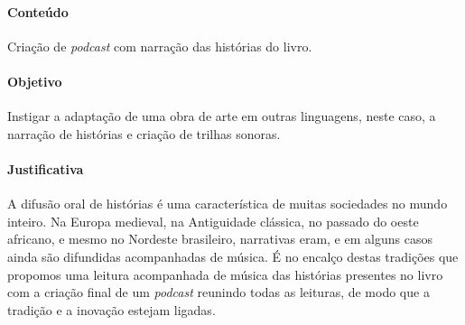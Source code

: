 \documentclass[12pt]{extarticle}
\begin{document}
 \paragraph{Conteúdo} Criação de \textit{podcast} com narração das histórias do livro.

 \paragraph{Objetivo} Instigar a adaptação de uma obra de arte em outras linguagens, neste
 caso, a narração de histórias e criação de trilhas sonoras. 



 \paragraph{Justificativa} A difusão oral de histórias é uma característica de
 muitas sociedades no mundo inteiro. Na Europa medieval, na Antiguidade clássica,
 no passado do oeste africano, e mesmo no Nordeste brasileiro, narrativas eram, e em alguns
 casos ainda são difundidas acompanhadas de música. 
 É no encalço destas tradições que propomos uma leitura acompanhada de música
 das histórias presentes no livro com a criação final de um \textit{podcast} reunindo todas
 as leituras, de modo que a tradição e a inovação estejam ligadas.   
\end{document}
